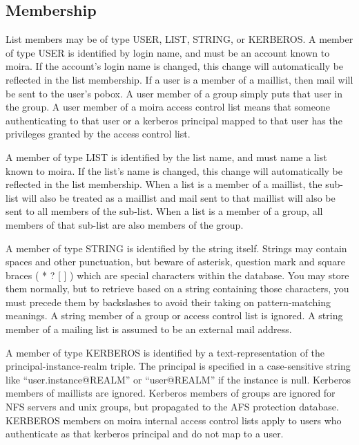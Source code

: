 \documentclass{book}
\begin{document}
\subsection{Membership}
\label{listmembership}

 List members may be of type USER, LIST, STRING, or
KERBEROS.  A member of type USER is identified by login name, and must
be an account known to moira.  If the account's login name is changed,
this change will automatically be reflected in the list membership.
If a user is a member of a maillist, then mail will be sent to the
user's pobox.    A user member of a group simply
puts that user in the group.  A user member of a moira access control
list means that someone authenticating to that user or a kerberos
principal mapped to that user has the privileges granted by the access
control list.

A member of type LIST is identified by the list name, and must name a
list known to moira.  If the list's name is changed, this change will
automatically be reflected in the list membership.  
When a list is a member of a maillist, the sub-list will also be
treated as a maillist and mail sent to that maillist will also be sent
to all members of the sub-list.  When a list is a member of a group,
all members of that sub-list are also members of the group.

 A member of type STRING is identified by the string
itself.   Strings may contain spaces and other
punctuation, but beware of asterisk, question mark and square braces (
* ? [ ] ) which are special characters within the database.  You may
store them normally, but to retrieve based on a string containing those
characters, you must precede them by backslashes to avoid their taking
on pattern-matching meanings.  A string member of a group or access
control list is ignored.  A string member of a mailing list is assumed
to be an external mail address.

 A member of type KERBEROS is identified by a
text-representation of the principal-instance-realm triple.  The
principal is specified in a case-sensitive string like
``user.instance@REALM'' or ``user@REALM'' if the instance is null.
Kerberos members of maillists are ignored.   Kerberos
members of groups are ignored for NFS servers and {\sc unix} groups, but
propagated to the AFS protection database.  KERBEROS members on moira
internal access control lists apply to users who authenticate as that
kerberos principal and do not map to a user.
\end{document}
